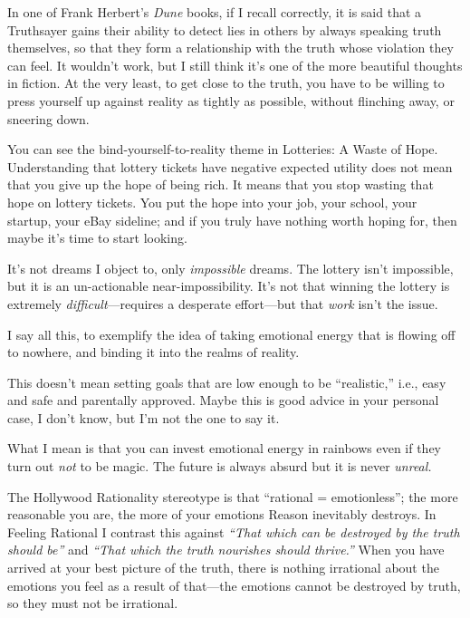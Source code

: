 {
 In one of Frank Herbert's \textit{Dune} books, if
I recall correctly, it is said that a Truthsayer gains their ability to
detect lies in others by always speaking truth themselves, so that they
form a relationship with the truth whose violation they can feel. It
wouldn't work, but I still think it's
one of the more beautiful thoughts in fiction. At the very least, to
get close to the truth, you have to be willing to press yourself up
against reality as tightly as possible, without flinching away, or
sneering down.}

{
 You can see the bind-yourself-to-reality theme in Lotteries: A
Waste of Hope. Understanding that lottery tickets have negative
expected utility does not mean that you give up the hope of being rich.
It means that you stop wasting that hope on lottery tickets. You put
the hope into your job, your school, your startup, your eBay sideline;
and if you truly have nothing worth hoping for, then maybe
it's time to start looking.}

{
 It's not dreams I object to, only
\textit{impossible} dreams. The lottery isn't
impossible, but it is an un-actionable near-impossibility.
It's not that winning the lottery is extremely
\textit{difficult}{}---requires a desperate effort---but that
\textit{work} isn't the issue.}

{
 I say all this, to exemplify the idea of taking emotional energy
that is flowing off to nowhere, and binding it into the realms of
reality.}

{
 This doesn't mean setting goals that are low
enough to be ``realistic,'' i.e.,
easy and safe and parentally approved. Maybe this is good advice in
your personal case, I don't know, but
I'm not the one to say it.}

{
 What I mean is that you can invest emotional energy in rainbows
even if they turn out \textit{not} to be magic. The future is always
absurd but it is never \textit{unreal.}}

{
 The Hollywood Rationality stereotype is that
``rational = emotionless''; the more
reasonable you are, the more of your emotions Reason inevitably
destroys. In Feeling Rational I contrast this against
\textit{``That which can be destroyed by the truth
should be''} and \textit{``That
which the truth nourishes should thrive.''} When you
have arrived at your best picture of the truth, there is nothing
irrational about the emotions you feel as a result of that---the
emotions cannot be destroyed by truth, so they must not be irrational.}

